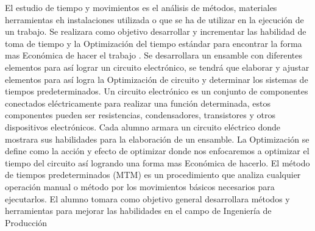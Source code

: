     El estudio de tiempo y movimientos es el análisis de métodos, materiales herramientas eh instalaciones utilizada o que se ha de utilizar en la ejecución de un trabajo. Se realizara como objetivo desarrollar y   incrementar las habilidad de toma de tiempo y la Optimización del tiempo estándar para encontrar la forma mas Económica de hacer el trabajo .
    Se  desarrollara un ensamble con diferentes elementos para así lograr un circuito electrónico, se tendrá que elaborar y ajustar elementos para así logra la Optimización de circuito y determinar los sistemas de tiempos predeterminados.
    Un circuito electrónico es un conjunto de componentes conectados eléctricamente para realizar una función determinada, estos componentes pueden ser resistencias, condensadores, transistores y otros dispositivos electrónicos.
    Cada alumno armara un circuito eléctrico donde mostrara sus habilidades para la elaboración de un ensamble.
    La Optimización se define como la acción y efecto de optimizar donde nos enfocaremos a optimizar el tiempo del circuito así logrando una forma mas Económica de hacerlo.
    El método de tiempos predeterminados (MTM) es un procedimiento que analiza cualquier operación manual o método por los movimientos básicos necesarios para ejecutarlos. 
    El alumno tomara como objetivo general desarrollara métodos y herramientas para mejorar las habilidades en el campo de Ingeniería de Producción 
    
     
    
